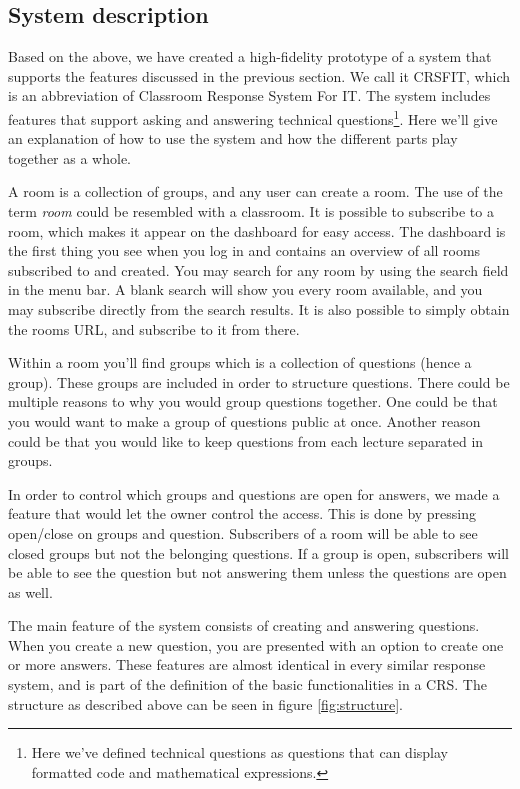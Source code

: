 \subsection{System description}

Based on the above, we have created a high-fidelity prototype of a system that supports the features discussed in the previous section. We call it CRSFIT, which is an abbreviation of Classroom Response System For IT. The system includes features that support asking and answering technical questions\footnote{Here we've defined technical questions as questions that can display formatted code and mathematical expressions.}. Here we'll give an explanation of how to use the system and how the different parts play together as a whole. 


A room is a collection of groups, and any user can create a room. The use of the term \emph{room} could be resembled with a classroom. It is possible to subscribe to a room, which makes it appear on the dashboard for easy access. The dashboard is the first thing you see when you log in and contains an overview of all rooms subscribed to and created. You may search for any room by using the search field in the menu bar. A blank search will show you every room available, and you may subscribe directly from the search results. It is also possible to simply obtain the rooms URL, and subscribe to it from there.

Within a room you'll find groups which is a collection of questions (hence a group). These groups are included in order to structure questions. There could be multiple reasons to why you would group questions together. One could be that you would want to make a group of questions public at once. Another reason could be that you would like to keep questions from each lecture separated in groups.


In order to control which groups and questions are open for answers, we made a feature that would let the owner control the access. This is done by pressing open/close on groups and question. Subscribers of a room will be able to see closed groups but not the belonging questions. If a group is open, subscribers will be able to see the question but not answering them unless the questions are open as well.

The main feature of the system consists of creating and answering questions. When you create a new question, you are presented with an option to create one or more answers.
These features are almost identical in every similar response system, and is part of the definition of the basic functionalities in a CRS. The structure as described above can be seen in figure \ref{fig:structure}.

